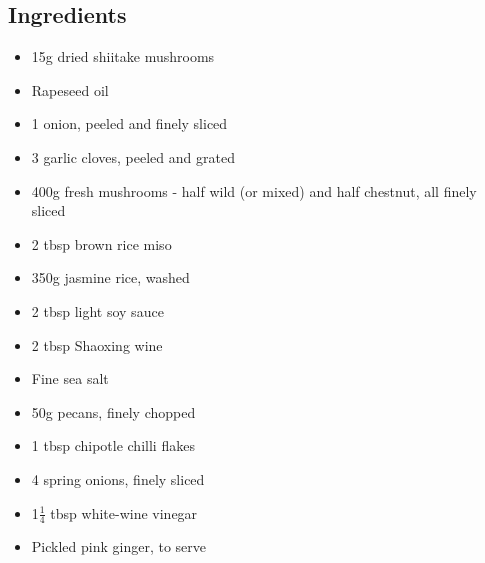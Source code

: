 \documentclass{book}
\begin{document}
\subsection*{Ingredients}
\begin{itemize}
\item 15g dried shiitake mushrooms 
\item Rapeseed oil 
\item 1 onion, peeled and finely sliced
\item 3 garlic cloves, peeled and grated 
\item 400g fresh mushrooms - half wild (or mixed) and half chestnut, all finely sliced 
\item 2 tbsp brown rice miso 
\item 350g jasmine rice, washed
\item 2 tbsp light soy sauce 
\item 2 tbsp Shaoxing wine
\item Fine sea salt 
\item 50g pecans, finely chopped 
\item 1 tbsp chipotle chilli flakes
\item 4 spring onions, finely sliced
\item 1$\frac{1}{4}$ tbsp white-wine vinegar 
\item Pickled pink ginger, to serve
\end{itemize}
\end{document}
